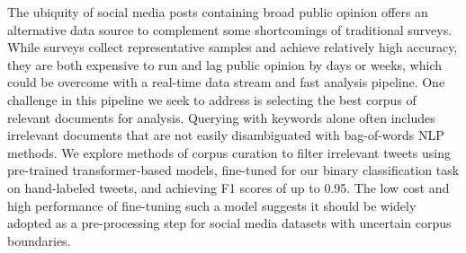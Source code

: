 The ubiquity of social media posts containing broad public opinion
offers an alternative data source to complement some shortcomings of traditional surveys.
While surveys collect representative samples and achieve relatively high accuracy,
they are both expensive to run and lag public opinion by days or weeks,
which could be overcome with a real-time data stream and fast analysis pipeline.
One challenge in this pipeline we seek to address is selecting the best corpus of relevant documents for analysis. 
Querying with keywords alone often includes irrelevant documents
that are not easily disambiguated with bag-of-words NLP methods. 
We explore methods of corpus curation to filter irrelevant tweets using pre-trained transformer-based models,
fine-tuned for our binary classification task on hand-labeled tweets,
and achieving F1 scores of up to 0.95.
The low cost and high performance of fine-tuning such a model suggests
it should be widely adopted as a pre-processing step for social media datasets with uncertain corpus boundaries.
